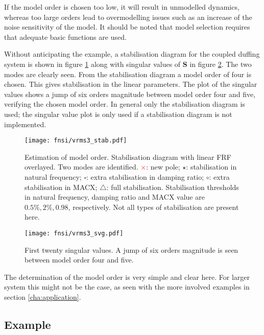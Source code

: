 

If the model order is chosen too low, it will result in unmodelled dynamics,
whereas too large orders lead to overmodelling issues such as an increase of the
noise sensitivity of the model. It should be noted that model selection requires
that adequate basic functions are used.

Without anticipating the example, a stabilisation diagram for the coupled
duffing system is shown in figure \ref{fig:fnsi_stab} along with singular values
of $\bm S$ in figure \ref{fig:fnsi_svg}. The two modes are clearly seen.
From the stabilisation diagram a model order of four is chosen. This gives
stabilisation in the linear parameters. The plot of the singular values shows a
jump of six orders magnitude between model order four and five, verifying the
chosen model order.
In general only the stabilisation diagram is used; the singular value plot is
only used if a stabilisation diagram is not implemented.

\begin{figure}
  \centering
  \texttt{[image: fnsi/vrms3\_stab.pdf]}
  \caption{Estimation of model order. Stabilisation diagram with linear FRF
    overlayed. Two modes are identified.
    \textcolor{red}{$\pmb\times$}: new pole;
    $\pmb\star$: stabilisation in natural frequency;
    $\pmb\square$: extra stabilisation in damping ratio;
    $\pmb\circ$: extra stabilisation in MACX;
    $\pmb\triangle$: full stabilisation.
    Stabilisation thresholds in natural frequency, damping ratio and MACX value
    are $0.5\%, 2\%, 0.98$, respectively. Not all types of stabilisation are
    present here.
  }
  \label{fig:fnsi_stab}
\end{figure}

\begin{figure}
  \centering
  \texttt{[image: fnsi/vrms3\_svg.pdf]}
  \caption{First twenty singular values. A jump of six orders magnitude is seen
    between model order four and five.}
  \label{fig:fnsi_svg}
\end{figure}

The determination of the model order is very simple and clear here. For larger system this
might not be the case, as seen with the more involved examples in section
\ref{cha:application}.

\subsection{Example}
\label{sec:fnsi_example}

